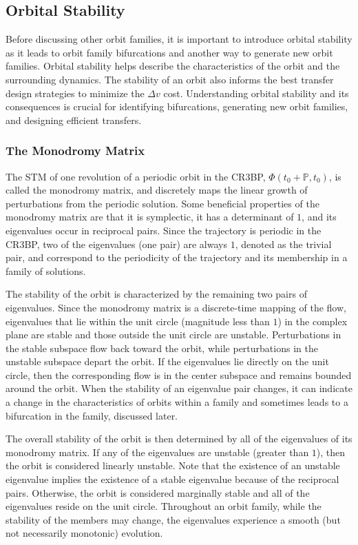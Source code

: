 \subsection{Orbital Stability}
Before discussing other orbit families, it is important to introduce orbital stability as it leads
to orbit family bifurcations and another way to generate new orbit families. Orbital stability
helps describe the characteristics of the orbit and the surrounding dynamics. The stability of an
orbit also informs the best transfer design strategies to minimize the $\Delta v$ cost.
Understanding orbital stability and its consequences is crucial for identifying bifurcations,
generating new orbit families, and designing efficient transfers.

\subsubsection{The Monodromy Matrix}
The STM of one revolution of a periodic orbit in the CR3BP, $\Phi(t_{0}+\mathbb{P},t_{0})$, is
called the monodromy matrix, and discretely maps the linear growth of perturbations from the
periodic solution. Some beneficial properties of the monodromy matrix are that it is symplectic, it
has a determinant of $1$, and its eigenvalues occur in reciprocal pairs\cite{ZimovanSpreen:2021}.
Since the trajectory is periodic in the CR3BP, two of the eigenvalues (one pair) are always $1$,
denoted as the trivial pair, and correspond to the periodicity of the trajectory and its membership
in a family of solutions.

The stability of the orbit is characterized by the remaining two pairs of eigenvalues. Since the
monodromy matrix is a discrete-time mapping of the flow, eigenvalues that lie within the unit
circle (magnitude less than $1$) in the complex plane are stable and those outside the unit circle
are unstable. Perturbations in the stable subspace flow back toward the orbit, while perturbations
in the unstable subspace depart the orbit. If the eigenvalues lie directly on the unit circle, then
the corresponding flow is in the center subspace and remains bounded around the orbit. When the
stability of an eigenvalue pair changes, it can indicate a change in the characteristics of orbits
within a family and sometimes leads to a bifurcation in the family, discussed later.

The overall stability of the orbit is then determined by all of the eigenvalues of its monodromy
matrix. If any of the eigenvalues are unstable (greater than $1$), then the orbit is considered
linearly unstable. Note that the existence of an unstable eigenvalue implies the existence of a
stable eigenvalue because of the reciprocal pairs. Otherwise, the orbit is considered marginally
stable and all of the eigenvalues reside on the unit circle. Throughout an orbit family, while the
stability of the members may change, the eigenvalues experience a smooth (but not necessarily
monotonic) evolution.

